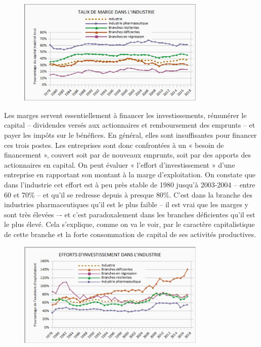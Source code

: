 \documentclass[a4paper]{article}
\begin{document}
\begin{figure}[H]
    \centering
    \includegraphics*[width=0.8\textwidth]{images/marge}
    \label{fig:marge}
\end{figure}

Les marges servent essentiellement à financer les investissements, rémunérer le capital – dividendes versés aux actionnaires et remboursement des emprunts – et payer les impôts sur le bénéfices. En général, elles sont insuffisantes pour financer ces trois postes. Les entreprises sont donc confrontées à un « besoin de financement », couvert soit par de nouveaux emprunts, soit par des apports des actionnaires en capital. On peut évaluer « l’effort d’investissement » d’une entreprise en rapportant son montant à la marge d’exploitation. On constate que dans l’industrie cet effort est à peu près stable de 1980 jusqu’à 2003-2004 – entre 60 et 70\% –  et qu’il se redresse depuis à presque 80\%. C’est dans la branche des industries pharmaceutiques qu’il est le plus faible – il est vrai que les marges y sont très élevées –- et c’est paradoxalement dans les branches déficientes qu’il est le plus élevé. Cela s’explique, comme on va le voir, par le caractère capitalistique de cette branche et la forte consommation de capital de ses activités productives.

\begin{figure}[H]
    \centering
    \includegraphics*[width=0.8\textwidth]{images/investissement}
    \label{fig:investissement2}
\end{figure}
\end{document}
